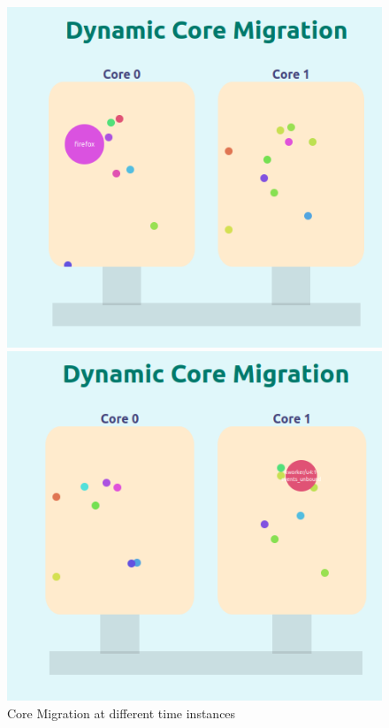 \documentclass[12pt]{article}
\begin{document}
\begin{figure}[H]
    \centering
    \begin{minipage}{0.45\textwidth}
        \centering
        \includegraphics[width=\textwidth]{logos and images/MIG_1.png}
    \end{minipage}
    \hfill
    \begin{minipage}{0.45\textwidth}
        \centering
        \includegraphics[width=\textwidth]{logos and images/MIG_2.png}
    \end{minipage}
    \caption{Core Migration at different time instances}
\end{figure}
\end{document}
